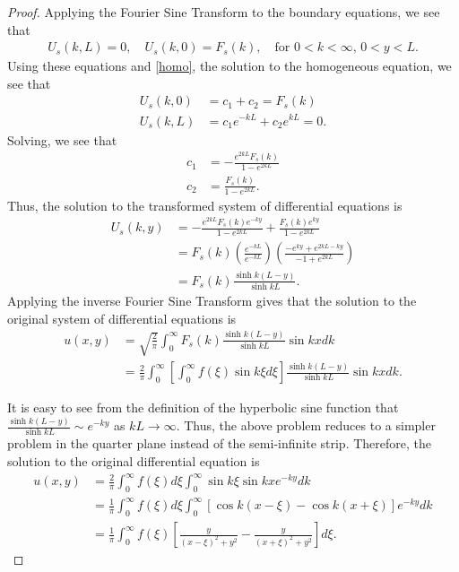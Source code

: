\begin{proof}
  Applying the Fourier Sine Transform to the boundary equations, we see that
  \begin{align*}
    U_s(k, L) = 0, \quad U_s(k, 0) = F_s(k), \quad \text{for $0 < k < \infty$, $0<y<L$}.
  \end{align*}
  Using these equations and \eqref{homo}, the solution to the homogeneous equation, we see that
  \begin{align*}
    U_s(k, 0) &= c_1 + c_2 = F_s(k) \\
    U_s(k, L) &= c_1 e^{-kL} + c_2 e^{kL} = 0.
  \end{align*}
  Solving, we see that
  \begin{align*}
    c_1 &= -\frac{e^{2kL}F_s(k)}{1-e^{2kL}}\\
    c_2 &= \frac{F_s(k)}{1-e^{2kL}}.
  \end{align*}
  Thus, the solution to the transformed system of differential equations is
  \begin{align*}
    U_s(k,y) &= -\frac{e^{2kL}F_s(k) e^{-ky}}{1-e^{2kL}} + \frac{F_s(k) e^{ky}}{1-e^{2kL}} \\
    &= F_s(k)\left(\frac{e^{-kL}}{e^{-kL}}\right)\left(\frac{-e^{ky}+e^{2kL-ky}}{-1+e^{2kL}}\right)\\
    &= F_s(k)\frac{\sinh k(L-y)}{\sinh kL}.
  \end{align*}
  Applying the inverse Fourier Sine Transform gives that the solution to the original system
  of differential equations is
  \begin{align*}
    u(x,y)
    &= \sqrt{\frac{2}{\pi}} \int_0^\infty F_s(k)\frac{\sinh k(L-y)}{\sinh kL} \sin kx dk \\
    &= \frac{2}{\pi} \int_0^\infty \left[\int_0^\infty f(\xi) \sin k\xi d\xi\right]\frac{\sinh k(L-y)}{\sinh kL} \sin kx dk.
  \end{align*}

  It is easy to see from the definition of the hyperbolic sine function that
  $\frac{\sinh k(L-y)}{\sinh kL} \sim e^{-ky}$ as $kL \to\infty$. Thus, the above problem reduces
  to a simpler problem in the quarter plane instead of the semi-infinite strip. Therefore,
  the solution to the original differential equation is
  \begin{align*}
    u(x, y) &= \frac{2}{\pi} \int_0^\infty f(\xi) d\xi\int_0^\infty \sin k\xi \sin kx e^{-k y} dk \\
    &= \frac{1}{\pi} \int_0^\infty f(\xi) d\xi\int_0^\infty \left[\cos k(x-\xi) - \cos k(x+\xi)\right] e^{-k y} dk \\
    &= \frac{1}{\pi} \int_0^\infty f(\xi)\left[\frac{y}{(x-\xi)^2 + y^2} - \frac{y}{(x+\xi)^2 + y^2}\right]d\xi.
  \end{align*}
\end{proof}
\newpage
